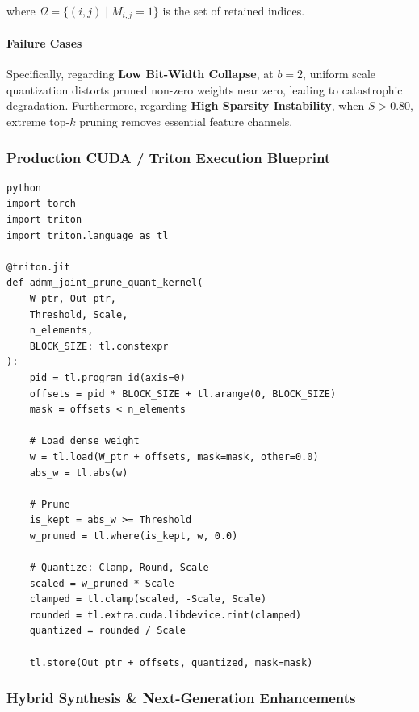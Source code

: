 where $\Omega = \{ (i,j) \mid M_{i,j} = 1 \}$ is the set of retained indices.

\paragraph{Failure Cases}

Specifically, regarding \textbf{Low Bit-Width Collapse}, at $b=2$, uniform scale quantization distorts pruned non-zero weights near zero, leading to catastrophic degradation. Furthermore, regarding \textbf{High Sparsity Instability}, when $S > 0.80$, extreme top-$k$ pruning removes essential feature channels.



\subsubsection*{Production CUDA / Triton Execution Blueprint}

\vspace{0.5em}
\begin{mdframed}[backgroundcolor=codebg, linecolor=codeframe, linewidth=1pt, roundcorner=4pt, innerleftmargin=2pt, innerrightmargin=5pt, innertopmargin=5pt, innerbottommargin=5pt]
\begin{lstlisting}
python
import torch
import triton
import triton.language as tl

@triton.jit
def admm_joint_prune_quant_kernel(
    W_ptr, Out_ptr,
    Threshold, Scale,
    n_elements,
    BLOCK_SIZE: tl.constexpr
):
    pid = tl.program_id(axis=0)
    offsets = pid * BLOCK_SIZE + tl.arange(0, BLOCK_SIZE)
    mask = offsets < n_elements

    # Load dense weight
    w = tl.load(W_ptr + offsets, mask=mask, other=0.0)
    abs_w = tl.abs(w)

    # Prune
    is_kept = abs_w >= Threshold
    w_pruned = tl.where(is_kept, w, 0.0)

    # Quantize: Clamp, Round, Scale
    scaled = w_pruned * Scale
    clamped = tl.clamp(scaled, -Scale, Scale)
    rounded = tl.extra.cuda.libdevice.rint(clamped)
    quantized = rounded / Scale

    tl.store(Out_ptr + offsets, quantized, mask=mask)
\end{lstlisting}
\end{mdframed}
\vspace{0.5em}


\subsubsection*{Hybrid Synthesis \& Next-Generation Enhancements}

